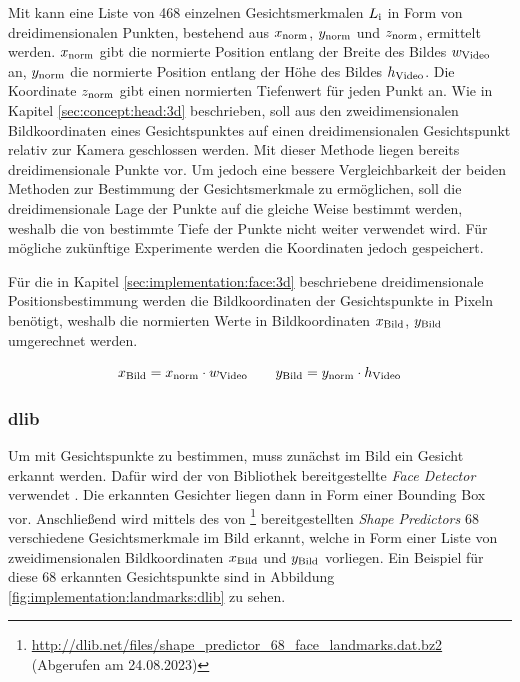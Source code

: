 Mit \mediapipe kann eine Liste von 468 einzelnen Gesichtsmerkmalen $L_{\text{i}}$ in Form von dreidimensionalen Punkten, bestehend aus $x_{\text{norm}}$, $y_{\text{norm}}$ und $z_{\text{norm}}$, ermittelt werden. $x_{\text{norm}}$ gibt die normierte Position entlang der Breite des Bildes $w_{\text{Video}}$ an, $y_{\text{norm}}$ die normierte Position entlang der Höhe des Bildes $h_{\text{Video}}$. Die Koordinate $z_{\text{norm}}$ gibt einen normierten Tiefenwert für jeden Punkt an. Wie in Kapitel \ref{sec:concept:head:3d} beschrieben, soll aus den zweidimensionalen Bildkoordinaten eines Gesichtspunktes auf einen dreidimensionalen Gesichtspunkt relativ zur Kamera geschlossen werden. Mit dieser Methode liegen bereits dreidimensionale Punkte vor. Um jedoch eine bessere Vergleichbarkeit der beiden Methoden zur Bestimmung der Gesichtsmerkmale zu ermöglichen, soll die dreidimensionale Lage der Punkte auf die gleiche Weise bestimmt werden, weshalb die von \mediapipe bestimmte Tiefe der Punkte nicht weiter verwendet wird. Für mögliche zukünftige Experimente werden die Koordinaten jedoch gespeichert.

Für die in Kapitel \ref{sec:implementation:face:3d} beschriebene dreidimensionale Positionsbestimmung werden die Bildkoordinaten der Gesichtspunkte in Pixeln benötigt, weshalb die normierten Werte in Bildkoordinaten $x_{\text{Bild}}$, $y_{\text{Bild}}$ umgerechnet werden.
 
\[
x_{\text{Bild}} = x_{\text{norm}} \cdot w_{\text{Video}} \qquad y_{\text{Bild}} = y_{\text{norm}} \cdot h_{\text{Video}}
\]

\subsubsection{dlib}

Um mit \dlib Gesichtspunkte zu bestimmen, muss zunächst im Bild ein Gesicht erkannt werden. Dafür wird der von \dlib Bibliothek bereitgestellte \textit{Face Detector} verwendet \cite{paper:dlib:face}. Die erkannten Gesichter liegen dann in Form einer Bounding Box vor. Anschließend wird mittels des von \dlib\footnote{\url{http://dlib.net/files/shape_predictor_68_face_landmarks.dat.bz2} (Abgerufen am 24.08.2023)} bereitgestellten \textit{Shape Predictors} 68 verschiedene Gesichtsmerkmale im Bild erkannt, welche in Form einer Liste von zweidimensionalen Bildkoordinaten $x_{\text{Bild}}$ und $y_{\text{Bild}}$ vorliegen. Ein Beispiel für diese 68 erkannten Gesichtspunkte sind in Abbildung \ref{fig:implementation:landmarks:dlib} zu sehen.

